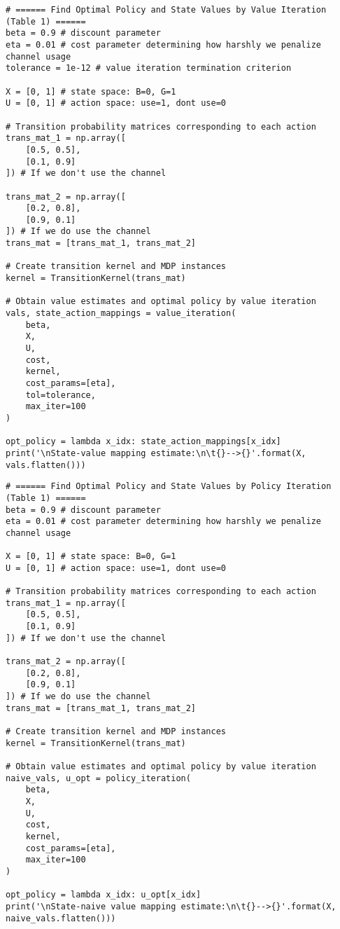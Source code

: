\documentclass[10pt]{article}
\newcommand{\1}[1]{\mathbbm{1}_{#1}}
\begin{document}
    \begin{verbatim}
# ====== Find Optimal Policy and State Values by Value Iteration (Table 1) ======
beta = 0.9 # discount parameter 
eta = 0.01 # cost parameter determining how harshly we penalize channel usage
tolerance = 1e-12 # value iteration termination criterion

X = [0, 1] # state space: B=0, G=1 
U = [0, 1] # action space: use=1, dont use=0

# Transition probability matrices corresponding to each action
trans_mat_1 = np.array([
    [0.5, 0.5],
    [0.1, 0.9]
]) # If we don't use the channel

trans_mat_2 = np.array([
    [0.2, 0.8],
    [0.9, 0.1]
]) # If we do use the channel
trans_mat = [trans_mat_1, trans_mat_2]

# Create transition kernel and MDP instances
kernel = TransitionKernel(trans_mat)

# Obtain value estimates and optimal policy by value iteration
vals, state_action_mappings = value_iteration(
    beta,
    X,
    U,
    cost,
    kernel,
    cost_params=[eta],
    tol=tolerance,
    max_iter=100
)

opt_policy = lambda x_idx: state_action_mappings[x_idx]
print('\nState-value mapping estimate:\n\t{}-->{}'.format(X, vals.flatten()))
    \end{verbatim}
    \begin{verbatim}
# ====== Find Optimal Policy and State Values by Policy Iteration (Table 1) ======
beta = 0.9 # discount parameter 
eta = 0.01 # cost parameter determining how harshly we penalize channel usage

X = [0, 1] # state space: B=0, G=1 
U = [0, 1] # action space: use=1, dont use=0

# Transition probability matrices corresponding to each action
trans_mat_1 = np.array([
    [0.5, 0.5],
    [0.1, 0.9]
]) # If we don't use the channel

trans_mat_2 = np.array([
    [0.2, 0.8],
    [0.9, 0.1]
]) # If we do use the channel
trans_mat = [trans_mat_1, trans_mat_2]

# Create transition kernel and MDP instances
kernel = TransitionKernel(trans_mat)

# Obtain value estimates and optimal policy by value iteration
naive_vals, u_opt = policy_iteration(
    beta, 
    X,
    U,
    cost,
    kernel,
    cost_params=[eta],
    max_iter=100
)

opt_policy = lambda x_idx: u_opt[x_idx]
print('\nState-naive value mapping estimate:\n\t{}-->{}'.format(X, naive_vals.flatten()))
    \end{verbatim}
\end{document}
